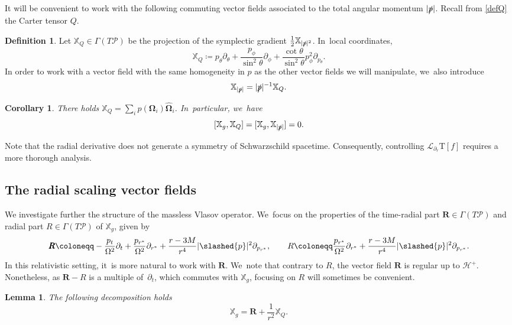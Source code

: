 \documentclass[10pt]{amsart}
\theoremstyle{plain}
\newtheorem{lemma}[proposition]{Lemma}
\newtheorem{corollary}[proposition]{Corollary}
\theoremstyle{definition}
\newtheorem{definition}[proposition]{Definition}
\newcommand\T{{\mathbb{X}}}
\renewcommand\H{{\mathcal{H}^+}}
\begin{document}
It will be convenient to work with the following commuting vector fields associated to the total angular momentum $|\slashed{p}|$. Recall from \eqref{defQ} the Carter tensor $Q$.

\begin{definition}
Let $\T_Q \in \Gamma(T\mathcal{P})$ be the projection of the symplectic gradient $\frac{1}{2}\T_{|\slashed{p}|^2}$. In~local coordinates,
\[
\T_Q \coloneqq p_{\theta} \partial_{\theta} + \frac{p_{\phi}}{ \sin^2\theta } \partial_{\phi} + \frac{\cot \theta }{ \sin^2 \theta} p_{\phi}^2 \partial_{p_{\theta} }.
\]
In order to work with a vector field with the same homogeneity in $p$ as the other vector fields we will manipulate, we~also introduce
\[
\T_{|\slashed{p}|} = |\slashed{p}|^{-1} \T_Q.
\]
\end{definition}

\begin{corollary}\label{CorTQ}
There holds $\T_Q=\sum_i p(\mathbf{\Omega}_i) \widehat{\mathbf{\Omega}}_i$. In~particular, we~have
\[
[\T_g,\T_Q]=[\T_g,\T_{|\slashed{p}|}]=0.
\]
\end{corollary}

Note that the radial derivative does not generate a symmetry of Schwarzschild spacetime. Consequently, controlling $\mathcal{L}_{\partial_r} \mathrm{T}[f]$ requires a more thorough analysis.

\subsection{The radial scaling vector fields}

We investigate further the structure of the massless Vlasov operator. We~focus on the properties of the time-radial part $\pmb{R} \in \Gamma(T\mathcal{P})$ and radial part $R\in \Gamma(T\mathcal{P})$ of $\T_g$, given by
\begin{equation}\label{eq:defR}
\pmb{R} \coloneqq -\frac{p_t}{\Omega^2} \partial_t+ \frac{p_{r^*}}{\Omega^2}\partial_{r^*}+\frac{r-3M}{r^4} |\slashed{p}|^2 \partial_{p_{r^*}}, \qquad R \coloneqq \frac{p_{r^*}}{\Omega^2}\partial_{r^*}+\frac{r-3M}{r^4} |\slashed{p}|^2 \partial_{p_{r^*}}.
\end{equation}
In this relativistic setting, it~is more natural to work with $\pmb{R}$. We~note that contrary to $R$, the vector field $\pmb{R}$ is regular up to $\H$. Nonetheless, as $\pmb{R}-R$ is a multiple of~$\partial_t$, which commutes with $\T_g$, focusing on $R$ will sometimes be convenient.

\begin{lemma}\label{LemDecompT}
The following decomposition holds
\[
\T_g= \pmb{R}+\frac{1}{r^2} \T_Q.
\]
\end{lemma}
\end{document}
